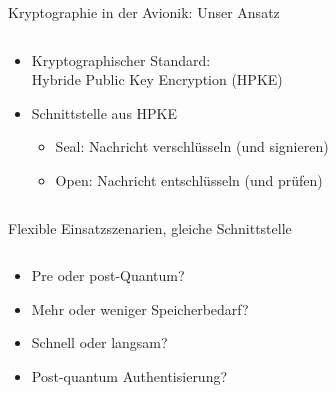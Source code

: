 \begin{frame}[c]{Kryptographie in der Avionik: Unser Ansatz}
  \begin{columns}[fullwidth,c]
    \begin{column}{.65\linewidth}
      \begin{itemize}
        \item Kryptographischer Standard:\\
        Hybride Public Key Encryption (HPKE)
        \item Schnittstelle aus HPKE
        \begin{itemize}
          \item Seal: Nachricht verschlüsseln (und signieren)
          \item Open: Nachricht entschlüsseln (und prüfen)
        \end{itemize}
      \end{itemize}
    \end{column}%
    \hfill
  \end{columns}
\end{frame}


\begin{frame}[c]{Flexible Einsatzszenarien, gleiche Schnittstelle}
  \begin{columns}[fullwidth,c]
  \hfill
    \begin{column}{.35\linewidth}
      \begin{itemize}
        \item Pre oder post-Quantum?
        \item Mehr oder weniger Speicherbedarf?
        \item Schnell oder langsam?
        \item Post-quantum Authentisierung? 
      \end{itemize}
    \end{column}%
  \end{columns}
\end{frame}


